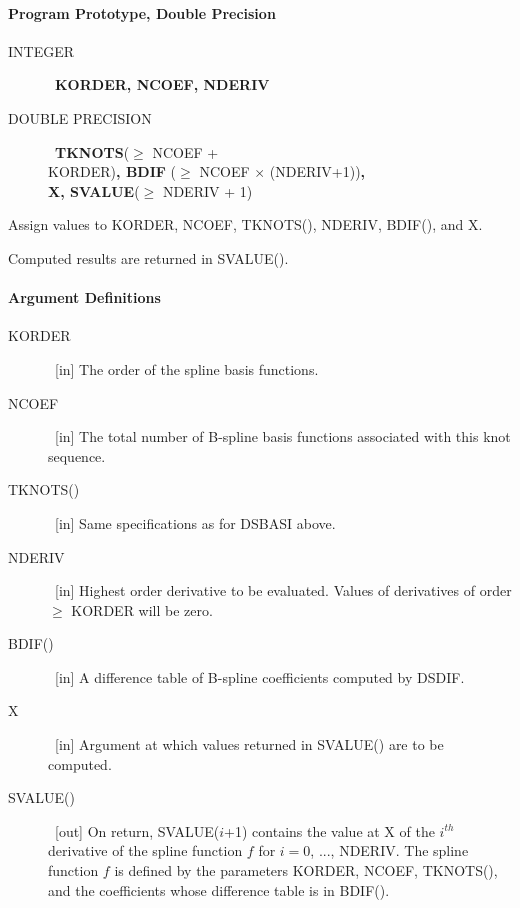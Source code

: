 \documentclass[twoside]{MATH77}
\begin{document}
\paragraph{Program Prototype, Double Precision}
\begin{description}
\item[INTEGER]  \ {\bf KORDER, NCOEF, NDERIV}

\item[DOUBLE PRECISION]  \ {\bf TKNOTS}($\geq $ NCOEF +\\ KORDER){\bf , BDIF}%
($\geq $ NCOEF $\times $ (NDERIV+1)){\bf ,\\ X, SVALUE}($\geq $ NDERIV + 1)
\end{description}
Assign values to KORDER, NCOEF, TKNOTS(), NDERIV, BDIF(), and X.
\begin{center}
\end{center}
Computed results are returned in SVALUE().

\paragraph{Argument Definitions}
\begin{description}
\item[KORDER]  \ [in] The order of the spline basis functions.

\item[NCOEF]  \ [in] The total number of B-spline basis functions associated
with this knot sequence.

\item[TKNOTS()]  \ [in] Same specifications as for DSBASI above.

\item[NDERIV]  \ [in] Highest order derivative to be evaluated. Values of
derivatives of order $\geq $ KORDER will be zero.

\item[BDIF()]  \ [in] A difference table of B-spline coefficients computed
by DSDIF.

\item[X]  \ [in] Argument at which values returned in SVALUE() are to be
computed.

\item[SVALUE()]  \ [out] On return, SVALUE($i$+1) contains the value at X of
the $i^{th}$ derivative of the spline function $f$ for $i=0$, ..., NDERIV.
The spline function $f$ is defined by the parameters KORDER, NCOEF,
TKNOTS(), and the coefficients whose difference table is in BDIF().
\end{description}
\end{document}
